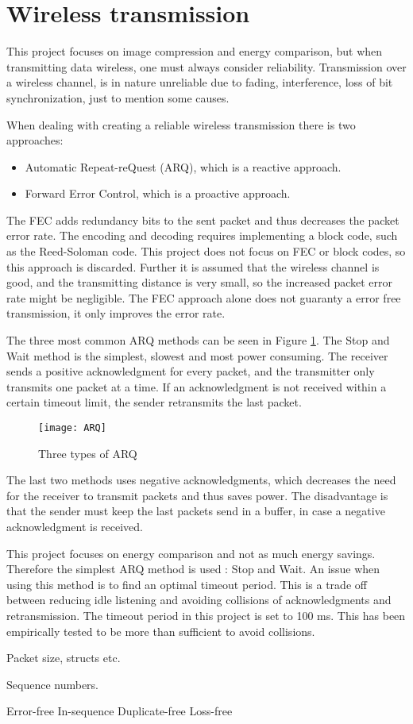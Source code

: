 \section{Wireless transmission}
This project focuses on image compression and energy comparison, but when transmitting data wireless, one must always consider reliability.
Transmission over a wireless channel, is in nature unreliable due to fading, interference, loss of bit synchronization, just to mention some causes.

When dealing with creating a reliable wireless transmission there is two approaches:
\begin{itemize}
\item Automatic Repeat-reQuest (ARQ), which is a reactive approach.
\item Forward Error Control, which is a proactive approach. 
\end{itemize}

The FEC adds redundancy bits to the sent packet and thus decreases the packet error rate. The encoding and decoding requires implementing a block code, such as the Reed-Soloman code. This project does not focus on FEC or block codes, so this approach is discarded. Further it is assumed that the wireless channel is good, and the transmitting distance is very small, so the increased packet error rate might be negligible. The FEC approach alone does not guaranty a error free transmission, it only improves the error rate.

The three most common ARQ methods can be seen in Figure \ref{fig:ARQ}. The Stop and Wait method is the simplest, slowest and most power consuming. The receiver sends a positive acknowledgment for every packet, and the transmitter only transmits one packet at a time. If an acknowledgment is not received within a certain timeout limit, the sender retransmits the last packet.

\begin{figure}
\centering
\texttt{[image: ARQ]}
\caption{Three types of ARQ}
\label{fig:ARQ}
\end{figure}

The last two methods uses negative acknowledgments, which decreases the need for the receiver to transmit packets and thus saves power. The disadvantage is that the sender must keep the last packets send in a buffer, in case a negative acknowledgment is received.

This project focuses on energy comparison and not as much energy savings. Therefore the simplest ARQ method is used : Stop and Wait. An issue when using this method is to find an optimal timeout period. This is a trade off between reducing idle listening and avoiding collisions of acknowledgments and retransmission. The timeout period in this project is set to 100 ms. This has been empirically tested to be more than sufficient to avoid collisions.


Packet size, structs etc.

Sequence numbers.

Error-free
In-sequence
Duplicate-free
Loss-free
